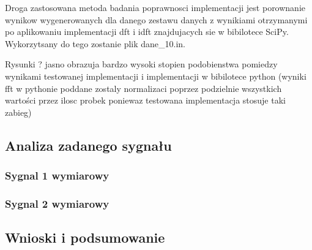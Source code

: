 \documentclass{artikel3}
\begin{document}
Droga zastosowana metoda badania poprawnosci implementacji jest porownanie wynikow wygenerowanych dla danego zestawu danych z wynikiami otrzymanymi po aplikowaniu implementacji dft i idft znajdujacych sie w bibilotece SciPy. 
Wykorzytsany do tego zostanie plik dane\_10.in.



Rysunki ? jasno obrazuja bardzo wysoki stopien podobienstwa pomiedzy wynikami testowanej implementacji i implementacji w bibilotece python (wyniki fft w pythonie poddane zostaly normalizaci poprzez podzielnie wszystkich wartości przez ilosc probek poniewaz testowana implementacja stosuje taki zabieg)




\subsection{Analiza zadanego sygnału}

\subsubsection{Sygnal 1 wymiarowy}

\subsubsection{Sygnal 2 wymiarowy}

\subsection{Wnioski i podsumowanie}
\end{document}
